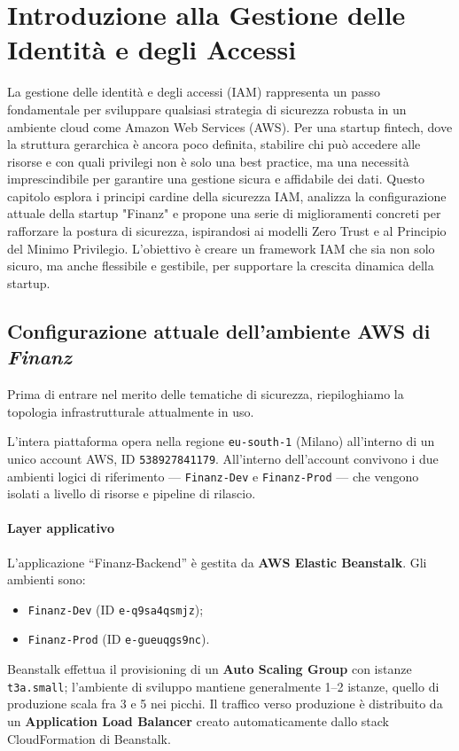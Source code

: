 \section{Introduzione alla Gestione delle Identità e degli Accessi}
La gestione delle identità e degli accessi (IAM) rappresenta un passo fondamentale per sviluppare qualsiasi strategia di sicurezza robusta in un ambiente cloud come Amazon Web Services (AWS). Per una startup fintech, dove la struttura gerarchica è ancora poco definita, stabilire chi può accedere alle risorse e con quali privilegi non è solo una best practice, ma una necessità imprescindibile per garantire una gestione sicura e affidabile dei dati. Questo capitolo esplora i principi cardine della sicurezza IAM, analizza la configurazione attuale della startup "Finanz" e propone una serie di miglioramenti concreti per rafforzare la postura di sicurezza, ispirandosi ai modelli Zero Trust e al Principio del Minimo Privilegio. L'obiettivo è creare un framework IAM che sia non solo sicuro, ma anche flessibile e gestibile, per supportare la crescita dinamica della startup.

\subsection{Configurazione attuale dell’ambiente AWS di \textit{Finanz}}
\label{subsec:aws_infrastruttura_attuale_cap4}

Prima di entrare nel merito delle tematiche di sicurezza, riepiloghiamo la topologia infrastrutturale attualmente in uso.

L’intera piattaforma opera nella regione \texttt{eu-south-1} (Milano) all’interno di un unico account AWS, ID \texttt{538927841179}. All’interno dell’account convivono i due ambienti logici di riferimento — \texttt{Finanz-Dev} e \texttt{Finanz-Prod} — che vengono isolati a livello di risorse e pipeline di rilascio.

\paragraph{Layer applicativo}
L’applicazione “Finanz-Backend” è gestita da \textbf{AWS Elastic Beanstalk}. Gli ambienti sono:
\begin{itemize}
  \item \texttt{Finanz-Dev} (ID \texttt{e-q9sa4qsmjz});
  \item \texttt{Finanz-Prod} (ID \texttt{e-gueuqgs9nc}).
\end{itemize}
Beanstalk effettua il provisioning di un \textbf{Auto Scaling Group} con istanze \texttt{t3a.small};
l’ambiente di sviluppo mantiene generalmente 1–2 istanze, quello di produzione scala fra 3 e 5 nei picchi. 
Il traffico verso produzione è distribuito da un \textbf{Application Load Balancer} creato automaticamente dallo stack CloudFormation di Beanstalk. 

